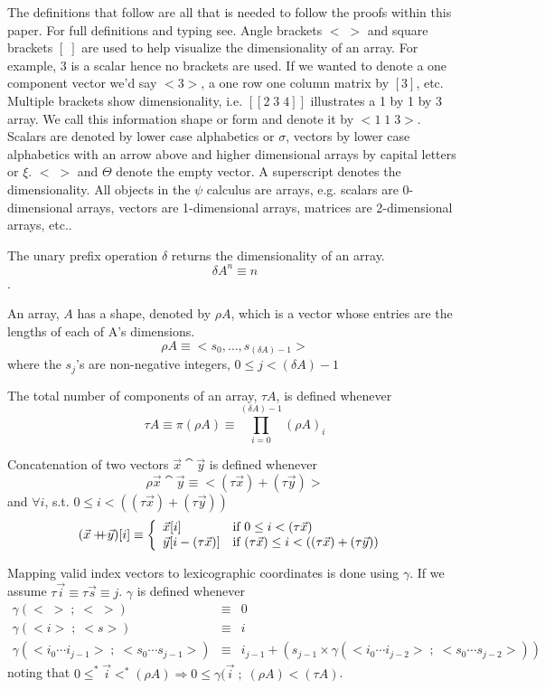 The definitions that follow are all that is needed to follow the
proofs within this paper. For full definitions and typing
see\cite{mul88,hai91}.
Angle brackets $<\;>$ and square brackets $[\;]$ are used to help visualize
the dimensionality of an array. For example, 3 is a scalar hence
no brackets are used. If we wanted to denote a one component
vector we'd say $<3>$, a one row one column matrix by $[3]$, etc.
Multiple brackets show dimensionality, i.e. $[[2\;3\;4]]$ illustrates
a 1 by 1 by 3 array. We call this information shape or form and denote
it by $<1\;1\;3>$. Scalars are denoted by lower case alphabetics or $\sigma$,
vectors by lower case alphabetics with an arrow above and higher
dimensional arrays by capital letters or $\xi$. $<\;>$ and $\Theta$ denote
the empty vector. A superscript  denotes the dimensionality.
All objects in the $\psi$ calculus are arrays, e.g. scalars are
0-dimensional arrays, vectors are 1-dimensional arrays, matrices
are 2-dimensional arrays, etc..
\begin{definition}
The unary prefix operation $\delta$ returns the dimensionality
of an array.
\[ \delta A^{n} \equiv n\].
\end{definition}
\begin{definition}
An array, $A$ has a shape, denoted by $\rho A$, which is a
vector whose entries are the lengths of each of A's dimensions.
\[ \rho A \equiv < s_{0}, \ldots,  s_{(\delta A)-1}> \]
where the $s_j$'s are non-negative integers, $0 \leq j < (\delta A)-1$
\end{definition}
\begin{definition}
The total number of components of an array, $\tau A$, is defined whenever
\[ \tau A \equiv \pi ( \rho A )  \equiv \prod_{i=0}^{(\delta A)-1} (\rho A)_{i}
\]
\end{definition}
\begin{definition}
Concatenation of two vectors $\vec x \cat \vec y$ is defined whenever
\[
\rho \vec x \cat \vec y \equiv < (\tau \vec x ) + (\tau \vec y)>\]
and $\forall i$, s.t. $0 \leq i < ((\tau \vec x ) + (\tau \vec y))$
\[
(\vec x +\!\!\!\!+ \vec y)[i] \equiv \left\{
\begin{array}{ll}
\vec x [i] & \mbox{if $ 0 \leq i < (\tau \vec x )$} \\
\vec y [i - (\tau \vec x)] &
\mbox{if $ (\tau \vec x) \leq i < ((\tau \vec x) + (\tau \vec y)) $ }
\end{array}
\right. \]
\end{definition}
\begin{definition}
Mapping valid index vectors to lexicographic coordinates is done using
$\gamma$. If we assume  $\tau \vec i \equiv \tau \vec s \equiv j$.
$\gamma$ is defined whenever
\begin{eqnarray*}
\gamma(<\;>\;;\;<\;>) &\equiv &0 \\
\gamma(<i>\;;\;<s>) &\equiv& i \\
\gamma(<i_{0} \cdots i_{j-1}>\;;\;<s_{0} \cdots s_{j-1}>) & \equiv &
i_{j-1} + ( s_{j-1} \times \gamma ( <i_{0} \cdots i_{j-2}>\;;\;< s_{0} \cdots
s_{j-2}>))
\end{eqnarray*}
noting that $0 \leq ^{*} \vec i <^{*} (\rho A) \Rightarrow
0 \leq  \gamma( \vec i\;;\;(\rho A ) < ( \tau A)$.
\end{definition}
